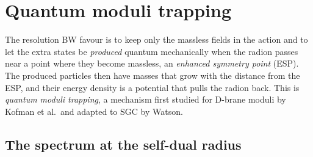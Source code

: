 \section{Quantum moduli trapping}\label{sec:cosmology:trapping}

The resolution BW favour is to keep only the massless fields in the action and to let the
extra states be \emph{produced} quantum mechanically when the radion passes near a point
where they become massless, an \emph{enhanced symmetry point}
(ESP).  The produced particles then have masses that grow with
the distance from the ESP, and their energy density is a potential that pulls the radion
back. This is \emph{quantum moduli trapping}, a mechanism first
studied for D-brane moduli by Kofman et al.\ and adapted to SGC by Watson.

\subsection{The spectrum at the self-dual radius}

